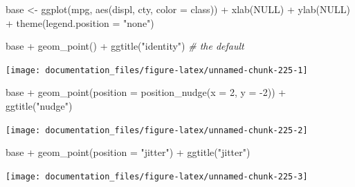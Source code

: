 \documentclass[
]{article}
\newenvironment{Shaded}{\begin{snugshade}}{\end{snugshade}}
\newcommand{\AttributeTok}[1]{\textcolor[rgb]{0.77,0.63,0.00}{#1}}
\newcommand{\CommentTok}[1]{\textcolor[rgb]{0.56,0.35,0.01}{\textit{#1}}}
\newcommand{\ConstantTok}[1]{\textcolor[rgb]{0.00,0.00,0.00}{#1}}
\newcommand{\DecValTok}[1]{\textcolor[rgb]{0.00,0.00,0.81}{#1}}
\newcommand{\FunctionTok}[1]{\textcolor[rgb]{0.00,0.00,0.00}{#1}}
\newcommand{\NormalTok}[1]{#1}
\newcommand{\OtherTok}[1]{\textcolor[rgb]{0.56,0.35,0.01}{#1}}
\newcommand{\SpecialCharTok}[1]{\textcolor[rgb]{0.00,0.00,0.00}{#1}}
\newcommand{\StringTok}[1]{\textcolor[rgb]{0.31,0.60,0.02}{#1}}
\begin{document}
\begin{Shaded}
\begin{Highlighting}[]
\NormalTok{base }\OtherTok{\textless{}{-}} \FunctionTok{ggplot}\NormalTok{(mpg, }\FunctionTok{aes}\NormalTok{(displ, cty, }\AttributeTok{color =}\NormalTok{ class)) }\SpecialCharTok{+} 
  \FunctionTok{xlab}\NormalTok{(}\ConstantTok{NULL}\NormalTok{) }\SpecialCharTok{+} \FunctionTok{ylab}\NormalTok{(}\ConstantTok{NULL}\NormalTok{) }\SpecialCharTok{+} \FunctionTok{theme}\NormalTok{(}\AttributeTok{legend.position =} \StringTok{"none"}\NormalTok{)}

\NormalTok{base }\SpecialCharTok{+} \FunctionTok{geom\_point}\NormalTok{() }\SpecialCharTok{+} \FunctionTok{ggtitle}\NormalTok{(}\StringTok{"identity"}\NormalTok{) }\CommentTok{\# the default}
\end{Highlighting}
\end{Shaded}

\begin{center}\texttt{[image: documentation\_files/figure-latex/unnamed-chunk-225-1]} \end{center}

\begin{Shaded}
\begin{Highlighting}[]
\NormalTok{base }\SpecialCharTok{+} \FunctionTok{geom\_point}\NormalTok{(}\AttributeTok{position =} \FunctionTok{position\_nudge}\NormalTok{(}\AttributeTok{x =} \DecValTok{2}\NormalTok{, }\AttributeTok{y =} \SpecialCharTok{{-}}\DecValTok{2}\NormalTok{)) }\SpecialCharTok{+} \FunctionTok{ggtitle}\NormalTok{(}\StringTok{"nudge"}\NormalTok{)}
\end{Highlighting}
\end{Shaded}

\begin{center}\texttt{[image: documentation\_files/figure-latex/unnamed-chunk-225-2]} \end{center}

\begin{Shaded}
\begin{Highlighting}[]
\NormalTok{base }\SpecialCharTok{+} \FunctionTok{geom\_point}\NormalTok{(}\AttributeTok{position =} \StringTok{"jitter"}\NormalTok{) }\SpecialCharTok{+} \FunctionTok{ggtitle}\NormalTok{(}\StringTok{"jitter"}\NormalTok{)}
\end{Highlighting}
\end{Shaded}

\begin{center}\texttt{[image: documentation\_files/figure-latex/unnamed-chunk-225-3]} \end{center}
\end{document}
